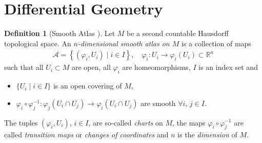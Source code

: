 \documentclass[12pt, a4paper]{article}
\numberwithin{equation}{section}
\theoremstyle{definition}
\theoremstyle{definition}
\newtheorem{defn}[thm]{Definition} %
\begin{document}
	\section{Differential Geometry}
	\begin{samepage}
		\begin{defn}[Smooth Atlas \cite{Lindemann-lec1}]
			Let $M$ be a second countable Hausdorff topological space. An \textit{$n$-dimensional smooth atlas on $M$}  is a collection of maps
			\begin{align*}
				\mathcal A = \left\{\left(\varphi_i, U_i\right)\mid i\in I\right\}, \quad \varphi_i: U_i \rightarrow \varphi_i(U_i) \subset \mathbb R^n
			\end{align*}
			such that all $U_i \subset M$ are open, all $\varphi_i$ are homeomorphisms, $I$ is an index set and 
			\begin{itemize}
				\item $\{U_i \mid i\in I\}$ is an open covering of $M$, 
				\item $\varphi_i \circ \varphi_j^{-1}: \varphi_j(U_i \cap U_j) \rightarrow \varphi_i(U_i \cap U_j)$ are smooth $\forall i$, $j \in I$. 
			\end{itemize}
			The tuples $(\varphi_i, U_i)$, $i\in I$, are so-called \textit{charts} on $M$, the maps $\varphi_i\circ \varphi_j^{-1}$ are called \textit{transition maps} or \textit{changes of coordinates} and $n$ is the \textit{dimension} of $M$.  \qquad\qquad\qquad\qquad\qquad\qquad\qquad\qquad\qquad{}	
		\end{defn}
	\end{samepage}
\end{document}

